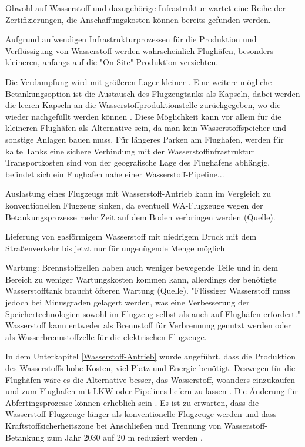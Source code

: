 Obwohl auf Wasserstoff und dazugehörige Infrastruktur wartet eine Reihe der Zertifizierungen, die Anschaffungskosten können bereits gefunden werden.

Aufgrund aufwendigen Infrastrukturprozessen für die Produktion und Verflüssigung von Wasserstoff werden wahrscheinlich Flughäfen, 
besonders kleineren, anfangs auf die "On-Site" Produktion verzichten.

Die Verdampfung wird mit größeren Lager kleiner \cite{colpan2022fuel}.
Eine weitere mögliche Betankungsoption ist die Austausch des Flugzeugtanks als Kapseln, dabei werden die leeren Kapseln an die 
Wasserstoffproduktionstelle zurückgegeben, wo die wieder nachgefüllt werden können \cite{colpan2022fuel}. 
Diese Möglichkeit kann vor allem für die kleineren Flughäfen als Alternative sein, da man kein Wasserstoffspeicher und 
sonstige Anlagen bauen muss.
Für längeres Parken am Flughafen, werden für kalte Tanks eine sichere Verbindung mit der Wasserstoffinfrastruktur \cite{colpan2022fuel} %
Transportkosten sind von der geografische Lage des Flughafens abhängig, befindet sich ein Flughafen nahe einer Wasserstoff-Pipeline...

Auslastung eines Flugzeugs mit Wasserstoff-Antrieb kann im Vergleich zu konventionellen Flugzeug sinken, da eventuell WA-Flugzeuge wegen der Betankungsprozesse
mehr Zeit auf dem Boden verbringen werden (Quelle).

Lieferung von gasförmigem Wasserstoff mit niedrigem Druck mit dem Straßenverkehr bis jetzt nur für ungenügende Menge möglich \cite{undertaking2022strategic}

Wartung:
Brennstoffzellen haben auch weniger bewegende Teile \cite{dalmia2022powering} und in dem Bereich zu weniger Wartungskosten kommen kann,
allerdings der benötigte Wasserstofftank braucht öfteren Wartung (Quelle).
%
"Flüssiger Wasserstoff muss jedoch bei Minusgraden gelagert werden, was eine Verbesserung der Speichertechnologien sowohl im Flugzeug selbst als auch auf Flughäfen erfordert."
Wasserstoff kann entweder als Brennstoff für Verbrennung genutzt werden oder als Wasserbrennstoffzelle für die elektrischen Flugzeuge. \cite{dalmia2022powering}

In dem Unterkapitel \ref{Wasserstoff-Antrieb} wurde angeführt, dass die Produktion des Wasserstoffs hohe Kosten, viel Platz und Energie benötigt. 
Deswegen für die Flughäfen wäre es die Alternative besser, das Wasserstoff, woanders einzukaufen und zum Flughafen 
mit LKW oder Pipelines liefern zu lassen \cite{gu2023hydrogen}. Die Änderung für Abfertingsprozesse können erheblich sein \cite{ati_hydrogen_infrastructure}. Es ist zu erwarten, dass die Wasserstoff-Flugzeuge länger als konventionelle Flugzeuge werden
und dass Kraftstoffsicherheitszone bei Anschließen und Trennung von Wasserstoff-Betankung zum Jahr 2030 auf 20 m reduziert werden \cite{hoelzen2022h2}.

